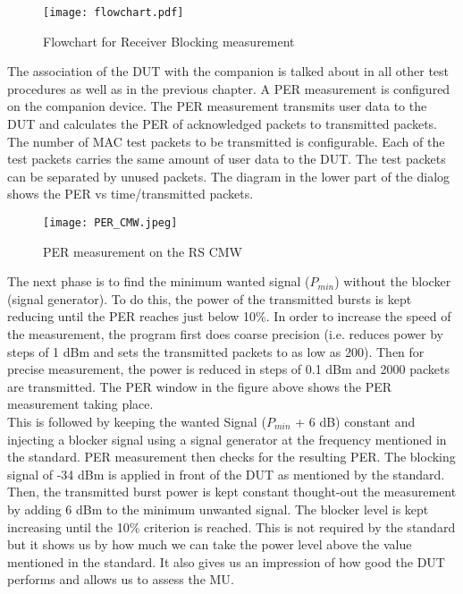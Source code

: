  \begin{figure}[H]
\centering
\texttt{[image: flowchart.pdf]}
\caption{Flowchart for Receiver Blocking measurement}
\label{fig:flowchartrxvlock}
\end{figure}

The association of the \acs{DUT} with the companion is talked about in all other test procedures as well as in the previous chapter. A \acf{PER} measurement is configured on the companion device. The \acs{PER} measurement transmits user data to the \acs{DUT} and calculates the \acs{PER} of acknowledged packets to transmitted packets. The number of MAC test packets to be transmitted is configurable. Each of the test packets carries the same amount of user data to the \acs{DUT}. The test packets can be separated by unused packets. The diagram in the lower part of the dialog shows the \acs{PER} vs time/transmitted packets.

 \begin{figure}[H]
\centering
\texttt{[image: PER\_CMW.jpeg]}
\caption{\ac{PER} measurement on the \acs{RS} \acs{CMW}}
\label{fig:per}
\end{figure}

The next phase is to find the minimum wanted signal ($P_{min}$) without the blocker (signal generator). To do this, the power of the transmitted bursts is kept reducing until the \acs{PER} reaches just below 10\%. In order to increase the speed of the measurement, the program first does coarse precision (i.e. reduces power by steps of 1 dBm and sets the transmitted packets to as low as 200). Then for precise measurement, the power is reduced in steps of 0.1 dBm and 2000 packets are transmitted. The \acs{PER} window in the figure above shows the \acs{PER} measurement taking place. \\
  
This is followed by keeping the wanted Signal ($P_{min}$ + 6 dB) constant and injecting a blocker signal using a signal generator at the frequency mentioned in the standard. \acs{PER} measurement then checks for the resulting \acs{PER}. The blocking signal of -34 dBm is applied in front of the \acs{DUT} as mentioned by the standard. Then, the transmitted burst power is kept constant thought-out the measurement by adding 6 dBm to the minimum unwanted signal. The blocker level is kept increasing until the 10\% criterion is reached. This is not required by the standard but it shows us by how much we can take the power level above the value mentioned in the standard. It also gives us an impression of how good the \acs{DUT} performs and allows us to assess the \acf{MU}.




